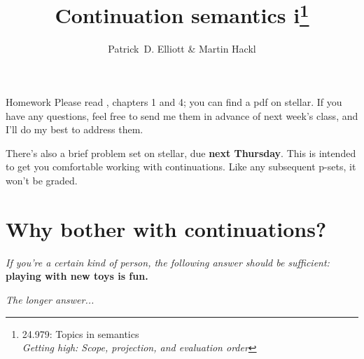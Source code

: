 \documentclass[nols,twoside,nofonts,nobib,nohyper]{tufte-handout}
\title{Continuation semantics i\thanks{24.979: Topics in
    semantics\\\noindent\textit{Getting high: Scope, projection, and evaluation order}}}
\author[Patrick D. Elliott and Martin Hackl]{Patrick~D. Elliott\sidenote{\texttt{pdell@mit.edu}} \& Martin Hackl\sidenote{\texttt{hackl@mit.edu}}}
\begin{document}
\maketitle%


\begin{tcolorbox}
  Homework
  \tcblower
Please read \cite{barkerShan2015}, chapters 1 and 4; you can find a pdf on stellar. If you have
    any questions, feel free to send me them in advance of next
    week's class, and I'll do my best to address them.

There's also a brief problem set on stellar, due \textbf{next Thursday}. This
    is intended to get you comfortable working with continuations. Like
    any subsequent p-sets, it won't be graded.
\end{tcolorbox}

\section{Why bother with continuations?}

\textit{If you're a certain kind of person, the following answer should be
  sufficient:}\\
\textbf{playing with new toys is fun.}

\textit{The longer answer...}
\end{document}
